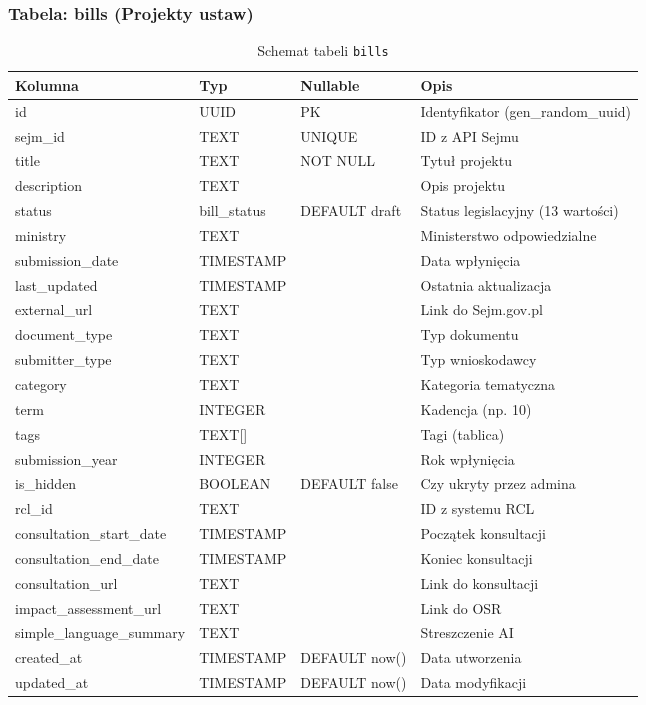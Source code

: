 \documentclass[12pt,a4paper]{article}
\begin{document}
\subsubsection{Tabela: bills (Projekty ustaw)}

\begin{table}[H]
\centering
\renewcommand{\arraystretch}{1.3}
\footnotesize
\begin{tabularx}{\textwidth}{l l l X}
\toprule
\textbf{Kolumna} & \textbf{Typ} & \textbf{Nullable} & \textbf{Opis} \\
\midrule
id & UUID & PK & Identyfikator (gen\_random\_uuid) \\
sejm\_id & TEXT & UNIQUE & ID z API Sejmu \\
title & TEXT & NOT NULL & Tytuł projektu \\
description & TEXT & & Opis projektu \\
status & bill\_status & DEFAULT draft & Status legislacyjny (13 wartości) \\
ministry & TEXT & & Ministerstwo odpowiedzialne \\
submission\_date & TIMESTAMP & & Data wpłynięcia \\
last\_updated & TIMESTAMP & & Ostatnia aktualizacja \\
external\_url & TEXT & & Link do Sejm.gov.pl \\
document\_type & TEXT & & Typ dokumentu \\
submitter\_type & TEXT & & Typ wnioskodawcy \\
category & TEXT & & Kategoria tematyczna \\
term & INTEGER & & Kadencja (np. 10) \\
tags & TEXT[] & & Tagi (tablica) \\
submission\_year & INTEGER & & Rok wpłynięcia \\
is\_hidden & BOOLEAN & DEFAULT false & Czy ukryty przez admina \\
rcl\_id & TEXT & & ID z systemu RCL \\
consultation\_start\_date & TIMESTAMP & & Początek konsultacji \\
consultation\_end\_date & TIMESTAMP & & Koniec konsultacji \\
consultation\_url & TEXT & & Link do konsultacji \\
impact\_assessment\_url & TEXT & & Link do OSR \\
simple\_language\_summary & TEXT & & Streszczenie AI \\
created\_at & TIMESTAMP & DEFAULT now() & Data utworzenia \\
updated\_at & TIMESTAMP & DEFAULT now() & Data modyfikacji \\
\bottomrule
\end{tabularx}
\caption{Schemat tabeli \texttt{bills}}
\end{table}
\end{document}
